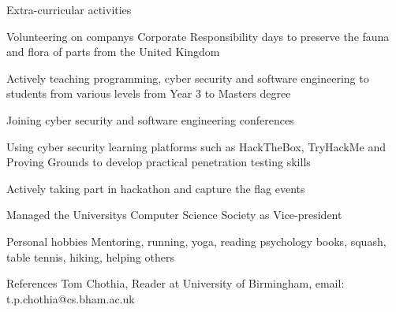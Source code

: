 \documentclass{resume} %
\begin{document}
\begin{rSection}{Extra-curricular activities}
\item Volunteering on company\textsc{}s Corporate Responsibility days to preserve the fauna and flora of parts from the United Kingdom 
\item Actively teaching programming, cyber security and software engineering to students from various levels from Year 3 to Masters degree 
\item Joining cyber security and software engineering conferences
\item Using cyber security learning platforms such as HackTheBox, TryHackMe and Proving Grounds to develop practical penetration testing skills
\item Actively taking part in hackathon and capture the flag events
\item Managed the University\textsc{}s Computer Science Society as Vice-president\\

\end{rSection}

\begin{rSection}{Personal hobbies}
Mentoring, running, yoga, reading psychology books, squash, table tennis, hiking, helping others\\
\end{rSection}

\begin{rSection}{References}
Tom Chothia, Reader at University of Birmingham, email: t.p.chothia@cs.bham.ac.uk
\end{rSection}
\end{document}

